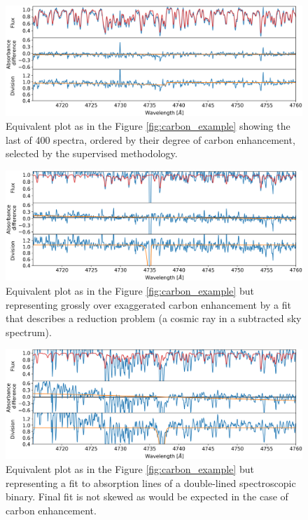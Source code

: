 \begin{figure}
	\centering
	\includegraphics[width=\textwidth]{last_170515005101173.png}
	\caption{Equivalent plot as in the Figure \ref{fig:carbon_example} showing the last of 400 spectra, ordered by their degree of carbon enhancement, selected by the supervised methodology.}
	\label{fig:carbon_last_supervised}
\end{figure}

\begin{figure}
	\centering
	\includegraphics[width=\textwidth]{bad_fit1_150902002901051.png}
	\caption{Equivalent plot as in the Figure \ref{fig:carbon_example} but representing grossly over exaggerated carbon enhancement by a fit that describes a reduction problem (a cosmic ray in a subtracted sky spectrum).}
	\label{fig:bad_fit1}
\end{figure}

\begin{figure}
	\centering
	\includegraphics[width=\textwidth]{bad_fit2_150603001801056.png}
	\caption{Equivalent plot as in the Figure \ref{fig:carbon_example} but representing a fit to absorption lines of a double-lined spectroscopic binary. Final fit is not skewed as would be expected in the case of carbon enhancement.}
	\label{fig:bad_fit2}
\end{figure}
